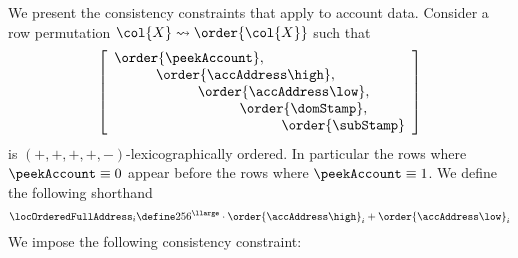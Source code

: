 We present the consistency constraints that apply to account data.
Consider a row permutation $\col{X} \rightsquigarrow \order{\col{X}}$ such that
\[
	\left[\begin{array}{l}
		\order{\peekAccount}, \\
		\quad\quad\quad \order{\accAddress\high}, \\
		\quad\quad\quad \quad\quad\quad \order{\accAddress\low}, \\
		\quad\quad\quad \quad\quad\quad \quad\quad\quad \order{\domStamp}, \\
		\quad\quad\quad \quad\quad\quad \quad\quad\quad \quad\quad\quad\order{\subStamp} \\
	\end{array}\right]
\]
\noindent is $(+, +, +, +, -)$-lexicographically ordered.
In particular the rows where $\peekAccount \equiv 0$ appear before the rows where $\peekAccount \equiv 1$.
We define the following shorthand
\[
	\locOrderedFullAddress_{i}
	\define
	256^\llarge \cdot \order{\accAddress\high}_{i} + \order{\accAddress\low}_{i}
\]
We impose the following consistency constraint:
